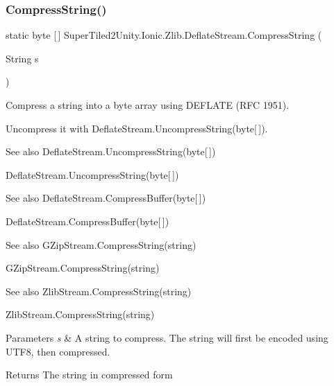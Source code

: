 \subsubsection{\texorpdfstring{Compress\+String()}{CompressString()}}
{\footnotesize\ttfamily static byte \mbox{[}$\,$\mbox{]} Super\+Tiled2\+Unity.\+Ionic.\+Zlib.\+Deflate\+Stream.\+Compress\+String (\begin{DoxyParamCaption}\item[{String}]{s }\end{DoxyParamCaption})\hspace{0.3cm}{\ttfamily [static]}}



Compress a string into a byte array using D\+E\+F\+L\+A\+TE (R\+FC 1951). 

Uncompress it with Deflate\+Stream.\+Uncompress\+String(byte\mbox{[}$\,$\mbox{]}). 

\begin{DoxySeeAlso}{See also}
Deflate\+Stream.\+Uncompress\+String(byte\mbox{[}$\,$\mbox{]})


\end{DoxySeeAlso}
Deflate\+Stream.\+Uncompress\+String(byte\mbox{[}$\,$\mbox{]})

\begin{DoxySeeAlso}{See also}
Deflate\+Stream.\+Compress\+Buffer(byte\mbox{[}$\,$\mbox{]})


\end{DoxySeeAlso}
Deflate\+Stream.\+Compress\+Buffer(byte\mbox{[}$\,$\mbox{]})

\begin{DoxySeeAlso}{See also}
G\+Zip\+Stream.\+Compress\+String(string)


\end{DoxySeeAlso}
G\+Zip\+Stream.\+Compress\+String(string)

\begin{DoxySeeAlso}{See also}
Zlib\+Stream.\+Compress\+String(string)


\end{DoxySeeAlso}
Zlib\+Stream.\+Compress\+String(string)


\begin{DoxyParams}{Parameters}
{\em s} & A string to compress. The string will first be encoded using U\+T\+F8, then compressed. \\
\hline
\end{DoxyParams}


\begin{DoxyReturn}{Returns}
The string in compressed form
\end{DoxyReturn}
\mbox{\label{class_super_tiled2_unity_1_1_ionic_1_1_zlib_1_1_deflate_stream_a31a30e285b2901fdc31f512a4202b9c7}} 
